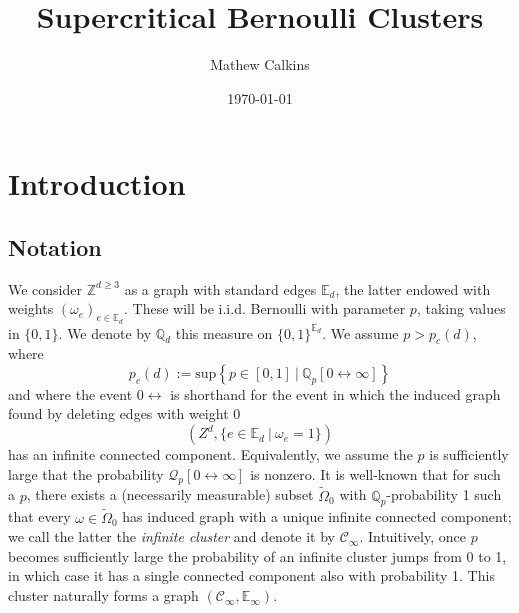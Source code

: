 \documentclass[11pt,letterpaper]{article}
\newcommand{\LP}{\left(}
\newcommand{\RP}{\right)}
\newcommand{\mc}[1]{\mathcal{#1}}
\newcommand{\Q}{\mathbb{Q}}
\newcommand{\E}{\mathbb{E}}
\newcommand{\Z}{\mathbb{Z}}
\begin{document}
\title{Supercritical Bernoulli Clusters}

\author{Mathew Calkins}

\date{\today}

 
\maketitle


\tableofcontents




\section{Introduction}
\subsection{Notation}
We consider $\Z^{d \geq 3}$ as a graph with standard edges $\mathbb{E}_d$, the latter endowed with weights $(\omega_e)_{e \in \E_d}$. These will be i.i.d. Bernoulli with parameter $p$, taking values in $\{0,1\}$. We denote by $\Q_d$ this measure on $\{0,1\}^{\E_d}$. We assume $p > p_c(d)$, where \begin{equation}
p_c(d) := \mbox{sup} \left\{ p \in [0,1] \ | \ \Q_p [0 \leftrightarrow \infty] \right\}
\end{equation}
and where the event $0 \leftrightarrow $ is shorthand for the event in which the induced graph found by deleting edges with weight 0 \begin{equation}
\LP Z^d, \{ e \in \E_d \ | \ \omega_e = 1 \} \RP
\end{equation}
has an infinite connected component. Equivalently, we assume the $p$ is sufficiently large that the probability $\mc{Q}_p[0 \leftrightarrow \infty]$ is nonzero. It is well-known that for such a $p$, there exists a (necessarily measurable) subset $\tilde{\Omega}_0$ with $\Q_p$-probability 1 such that every $\omega \in \tilde{\Omega}_0$ has induced graph with a unique infinite connected component; we call the latter the \textit{infinite cluster} and denote it by $\mc{C}_\infty$. Intuitively, once $p$ becomes sufficiently large the probability of an infinite cluster jumps from 0 to 1, in which case it has a single connected component also with probability 1. This cluster naturally forms a graph $\LP \mc{C}_\infty, \E_\infty \RP$.
\end{document}

